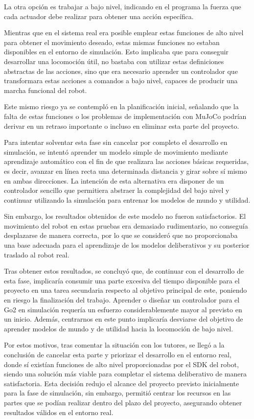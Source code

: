 La otra opción es trabajar a bajo nivel, indicando en el programa la fuerza que cada actuador debe realizar para obtener una acción específica.

Mientras que en el sistema real era posible emplear estas funciones de alto nivel para obtener el movimiento deseado, estas mismas funciones no estaban disponibles en el entorno de 
simulación. Esto implicaba que para conseguir desarrollar una locomoción útil, no bastaba con utilizar estas definiciones abstractas de las acciones, sino que era necesario aprender un 
controlador que transformara estas acciones a comandos a bajo nivel, capaces de producir una marcha funcional del robot. 

Este mismo riesgo ya se contempló en la planificación inicial, señalando que la falta de estas funciones o los problemas de implementación con MuJoCo podrían derivar en un retraso 
importante o incluso en eliminar esta parte del proyecto.

Para intentar solventar esta fase sin cancelar por completo el desarrollo en simulación, se intentó aprender un modelo simple de movimiento mediante aprendizaje automático con el fin de 
que realizara las acciones básicas requeridas, es decir, avanzar en línea recta una determinada distancia y girar sobre sí mismo en ambas direcciones. La intención de esta alternativa era disponer 
de un controlador sencillo que permitiera abstraer la complejidad del bajo nivel y continuar utilizando la simulación para entrenar los modelos de mundo y utilidad.

Sin embargo, los resultados obtenidos de este modelo no fueron satisfactorios. El movimiento del robot en estas pruebas era demasiado rudimentario, no conseguía desplazarse de manera 
correcta, por lo que se consideró que no proporcionaba una base adecuada para el aprendizaje de los modelos deliberativos y su posterior traslado al robot real.

Tras obtener estos resultados, se concluyó que, de continuar con el desarrollo de esta fase, implicaría consumir una parte excesiva del tiempo disponible para el proyecto en una tarea 
secundaria respecto al objetivo principal de este, poniendo en riesgo la finalización del trabajo. Aprender o diseñar un controlador para el Go2 en simulación requería un esfuerzo 
considerablemente mayor al previsto en un inicio. Además, centrarnos en este punto implicaría desviarse del objetivo de aprender modelos de mundo y de utilidad hacia la locomoción de bajo nivel. 

Por estos motivos, tras comentar la situación con los tutores, se llegó a la conclusión de cancelar esta parte y priorizar el desarrollo en el entorno real, donde sí existían funciones 
de alto nivel proporcionadas por el SDK del robot, siendo una solución más viable para completar el sistema deliberativo de manera satisfactoria. Esta decisión redujo el alcance del 
proyecto previsto inicialmente para la fase de simulación, sin embargo, permitió centrar los recursos  en las partes que se podían realizar dentro del plazo del proyecto, asegurando 
obtener resultados válidos en el entorno real.


